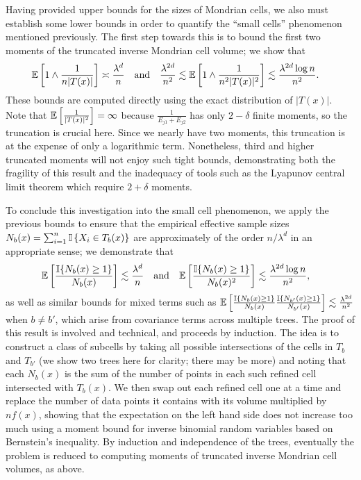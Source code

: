 Having provided upper bounds for the sizes of Mondrian cells, we also must
establish some lower bounds in order to quantify the ``small cells'' phenomenon
mentioned previously. The first step towards this is to bound the first two
moments of the truncated inverse Mondrian cell volume; we show that
%
\begin{align*}
  \mathbb{E}\left[ 1 \wedge \frac{1}{n |T(x)|} \right]
  &\asymp \frac{\lambda^d}{n}
  &&\text{and}
  &\frac{\lambda^{2d}}{n^2}
  &\lesssim
  \mathbb{E}\left[ 1 \wedge \frac{1}{n^2 |T(x)|^2} \right]
  \lesssim \frac{\lambda^{2d} \log n}{n^2}.
\end{align*}
%
These bounds are computed directly using the exact distribution of $|T(x)|$.
Note that $\mathbb{E}\left[ \frac{1}{|T(x)|^2} \right] = \infty$ because
$\frac{1}{E_{j1} + E_{j2}}$ has only $2 - \delta$ finite moments, so the
truncation is crucial here. Since we nearly have two moments, this
truncation is at the expense of only a logarithmic term. Nonetheless, third and
higher truncated moments will not enjoy such tight bounds, demonstrating both
the fragility of this result and the inadequacy of tools such as the Lyapunov
central limit theorem which require $2 + \delta$ moments.

To conclude this investigation into the small cell phenomenon, we apply the
previous bounds to ensure that the empirical effective sample sizes
$N_b(x) = \sum_{i=1}^{n} \mathbb{I} \left\{ X_i \in T_b(x) \right\}$ are approximately
of the order $n / \lambda^d$ in an appropriate sense; we demonstrate that
%
\begin{align*}
  \mathbb{E}\left[ \frac{\mathbb{I}\{N_b(x) \geq 1\}}{N_b(x)} \right]
  &\lesssim \frac{\lambda^d}{n}
  &&\text{and}
  &\mathbb{E}\left[ \frac{\mathbb{I}\{N_b(x) \geq 1\}}{N_b(x)^2} \right]
  &\lesssim \frac{\lambda^{2d} \log n}{n^2},
\end{align*}
%
as well as similar bounds for mixed terms such as
%
$\mathbb{E} \left[
  \frac{\mathbb{I}\{N_b(x) \geq 1\}}{N_b(x)}
  \frac{\mathbb{I}\{N_{b'}(x) \geq 1\}}{N_{b'}(x)}
\right]
\lesssim \frac{\lambda^{2d}}{n^2}$
%
when $b \neq b'$, which arise from covariance terms across multiple trees. The
proof of this result is involved and technical, and proceeds by induction. The
idea is to construct a class of subcells by taking all possible intersections
of the cells in $T_b$ and $T_{b'}$ (we show two trees here for clarity; there
may be more) and noting that each $N_b(x)$ is the sum of the number of points
in each such refined cell intersected with $T_b(x)$. We then swap out each
refined cell one at a time and replace the number of data points it contains
with its volume multiplied by $n f(x)$, showing that the expectation on the
left hand side does not increase too much using a moment bound for inverse
binomial random variables based on Bernstein's inequality. By induction and
independence of the trees, eventually the problem is reduced to computing
moments of truncated inverse Mondrian cell volumes, as above.

